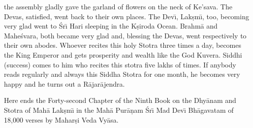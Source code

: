 the assembly gladly gave the garland of flowers on the neck of Ke'sava. The Devas, satisfied, went back to their own places. The Dev\={\i}, Lak\d{s}m\={\i}, too, becoming very glad went to \'Sr\={\i} Hari sleeping in the K\d{s}iroda Ocean. Brahm\=a and Mahe\'svara, both became very glad and, blessing the Devas, went respectively to their own abodes. Whoever recites this holy Stotra three times a day, becomes the King Emperor and gets prosperity and wealth like the God Kuvera. Siddhi (success) comes to him who recites this stotra five lakhs of times. If anybody reads regularly and always this Siddha Stotra for one month, he becomes very happy and he turns out a R\=ajar\=ajendra.

Here ends the Forty-second Chapter of the Ninth Book on the Dhy\=anam and Stotra of Mah\=a Lak\d{s}m\={\i} in the Mah\=a Pur\=a\d{n}am \'Sr\={\i} Mad Dev\={\i} Bh\=agavatam of 18,000 verses by Mahar\d{s}i Veda Vy\=asa.



